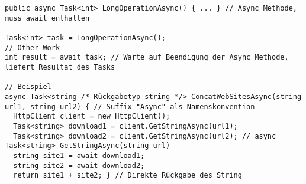 \begin{lstlisting}
public async Task<int> LongOperationAsync() { ... } // Async Methode, muss await enthalten

Task<int> task = LongOperationAsync();
// Other Work
int result = await task; // Warte auf Beendigung der Async Methode, liefert Resultat des Tasks

// Beispiel
async Task<string /* Rückgabetyp string */> ConcatWebSitesAsync(string url1, string url2) { // Suffix "Async" als Namenskonvention
  HttpClient client = new HttpClient();
  Task<string> download1 = client.GetStringAsync(url1);
  Task<string> download2 = client.GetStringAsync(url2); // async Task<string> GetStringAsync(string url)
  string site1 = await download1;
  string site2 = await download2;
  return site1 + site2; } // Direkte Rückgabe des String
\end{lstlisting}


